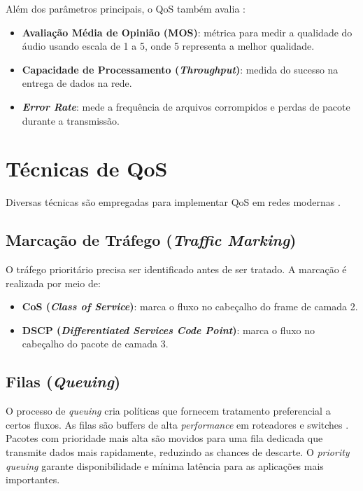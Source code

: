 Além dos parâmetros principais, o QoS também avalia \cite{fortinet2024,techtarget2024}:

\begin{itemize}
  \item \textbf{Avaliação Média de Opinião (MOS)}: métrica para medir a qualidade
  do áudio usando escala de 1 a 5, onde 5 representa a melhor qualidade.
  \item \textbf{Capacidade de Processamento (\textit{Throughput})}: medida do
  sucesso na entrega de dados na rede.
  \item \textbf{\textit{Error Rate}}: mede a frequência de arquivos corrompidos e
  perdas de pacote durante a transmissão.
\end{itemize}

\section{Técnicas de QoS}

Diversas técnicas são empregadas para implementar QoS em redes modernas
\cite{fortinet2024,techtarget2024}.

\subsection{Marcação de Tráfego (\textit{Traffic Marking})}

O tráfego prioritário precisa ser identificado antes de ser tratado. A marcação
é realizada por meio de:

\begin{itemize}
  \item \textbf{CoS (\textit{Class of Service})}: marca o fluxo no cabeçalho do
  frame de camada 2.
  \item \textbf{DSCP (\textit{Differentiated Services Code Point})}: marca o fluxo
  no cabeçalho do pacote de camada 3.
\end{itemize}

\subsection{Filas (\textit{Queuing})}

O processo de \textit{queuing} cria políticas que fornecem tratamento preferencial
a certos fluxos. As filas são buffers de alta \textit{performance} em roteadores e
switches \cite{fortinet2024}. Pacotes com prioridade mais alta são movidos para uma
fila dedicada que transmite dados mais rapidamente, reduzindo as chances de
descarte. O \textit{priority queuing} garante disponibilidade e mínima latência para
as aplicações mais importantes.

